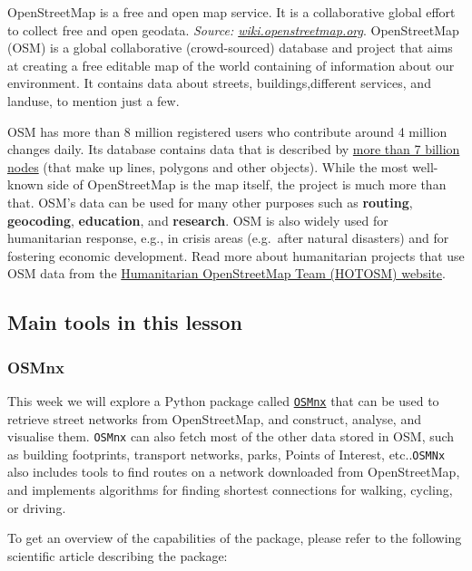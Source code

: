 \documentclass[
  letterpaper,
  DIV=11,
  numbers=noendperiod]{scrreprt}
\begin{document}
OpenStreetMap is a free and open map service. It is a collaborative
global effort to collect free and open geodata. \emph{Source:
\href{https://wiki.openstreetmap.org/wiki/Logos}{wiki.openstreetmap.org}}.
OpenStreetMap (OSM) is a global collaborative (crowd-sourced) database
and project that aims at creating a free editable map of the world
containing of information about our environment. It contains data about
streets, buildings,different services, and landuse, to mention just a
few.

OSM has more than 8 million registered users who contribute around 4
million changes daily. Its database contains data that is described by
\href{http://wiki.openstreetmap.org/wiki/Stats}{more than 7 billion
nodes} (that make up lines, polygons and other objects). While the most
well-known side of OpenStreetMap is the map itself, the project is much
more than that. OSM's data can be used for many other purposes such as
\textbf{routing}, \textbf{geocoding}, \textbf{education}, and
\textbf{research}. OSM is also widely used for humanitarian response,
e.g., in crisis areas (e.g.~after natural disasters) and for fostering
economic development. Read more about humanitarian projects that use OSM
data from the \href{https://www.hotosm.org}{Humanitarian OpenStreetMap
Team (HOTOSM) website}.

\subsection{Main tools in this lesson}\label{main-tools-in-this-lesson}

\subsubsection{OSMnx}\label{osmnx}

This week we will explore a Python package called
\href{https://github.com/gboeing/osmnx}{\texttt{OSMnx}} that can be used
to retrieve street networks from OpenStreetMap, and construct, analyse,
and visualise them. \texttt{OSMnx} can also fetch most of the other data
stored in OSM, such as building footprints, transport networks, parks,
Points of Interest, etc..\texttt{OSMNx} also includes tools to find
routes on a network downloaded from OpenStreetMap, and implements
algorithms for finding shortest connections for walking, cycling, or
driving.

To get an overview of the capabilities of the package, please refer to
the following scientific article describing the package:
\end{document}
